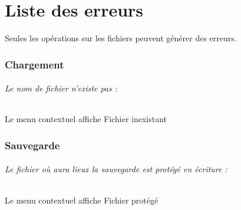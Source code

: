 \part{Liste des erreurs}
Seules les opérations sur les fichiers peuvent générer des erreurs.

\section{Chargement}
\paragraph{Le nom de fichier n'existe pas :} Le menu contextuel affiche \og Fichier inexistant\fg

\section{Sauvegarde}
\paragraph{Le fichier où aura lieux la sauvegarde est protégé en écriture :} Le menu contextuel affiche \og Fichier protégé\fg

